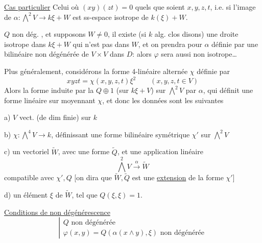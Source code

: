 \uline{Cas particulier} Celui où $(xy)(zt)=0$ quels que soient $x,y,z,t$, i.e.
\margin{[i.e. $(H^1)H^3=0$ dans $H^4$ !]}
si l'image de $\alpha:\bigwedge^2V\longrightarrow k\xi+W$ est   ss-espace isotrope de $k(\xi)+W$.

$Q$ non dég. , et supposons $W\neq0$, il existe (si $k$  alg. clos disons) une droite isotrope  dans $k\xi+W$ qui n'est pas dans $W$, et on prendra pour $\alpha$  définie par une  bilinéaire  non dégénérée  de $V\times V$ dans $D$: alors $\varphi$ sera aussi non isotrope\ldots


Plus généralement, considérons la forme 4-linéaire alternée $\chi$ définie par
\[
xyzt=\chi(x,y,z,t)\xi^2\qquad(x,y,z,t\in V)
\]
Alors la forme  induite par la  $Q\oplus1$ (sur $k\xi+V$) sur $\bigwedge^2 V$ par $\alpha$, qui définit une  forme linéaire sur
moyennant $\chi$, et donc les données sont les suivantes

a) $V$ vect. (de dim finie) sur $k$


b) $\chi:\bigwedge^4V\longrightarrow k$, définissant une forme bilinéaire symétrique $\chi'$ sur $\bigwedge^2V$

c) un vectoriel $\widetilde W$, avec une forme  $\widetilde Q$, et une application linéaire
\[
\bigwedge^2V\xrightarrow{\alpha}\widetilde W
\]
compatible avec $\chi',Q$ [on dira que $\widetilde W,\widetilde Q$ est une \uline{extension} de la forme $\chi'$]

d) un élément $\xi$ de $\widetilde W$, tel que $Q(\xi,\xi)=1$.

\uline{Conditions de non dégénérescence}
\[
\left|\begin{array}{l}
Q\text{ non dégénérée}\\
\varphi(x,y)=Q(\alpha(x\wedge y),\xi)\text{ non dégénérée}
\end{array}\right.
\]

